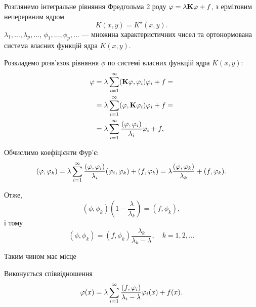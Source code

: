 Розглянемо інтегральне рівняння Фредгольма 2 роду $\phi = \lambda \bf{K} \phi + f$, з ермітовим неперервним ядром 
\begin{equation} 
    K(x, y) = K^\star  (x, y).
\end{equation}
$\lambda_1, \ldots, \lambda_p, \ldots$, $\phi_1, \ldots, \phi_p, \ldots$ --- множина характеристичних чисел та ортонормована система власних функцій ядра $K(x, y)$. \medskip

Розкладемо розв'язок рівняння $\phi$ по системі власних функцій ядра $K(x, y)$:
\begin{equation}
    \begin{aligned}
        \phi &= \lambda \Sum_{i = 1}^\infty (\bf{K}\phi, \phi_i) \phi_i + f = \\
        &= \lambda \Sum_{i = 1}^\infty (\phi, \bf{K} \phi_i) \phi_i + f = \\
        &= \lambda \Sum_{i = 1}^\infty \dfrac{(\phi, \phi_i)}{\lambda_i} \phi_i + f,
    \end{aligned}
\end{equation}

Обчислимо коефіцієнти Фур'є:
\begin{equation}
    (\phi, \phi_k) = \lambda \Sum_{i = 1}^\infty \dfrac{(\phi, \phi_i)}{\lambda_i} (\phi_i, \phi_k) + (f, \phi_k) = \lambda \dfrac{(\phi, \phi_k)}{\lambda_k} + (f, \phi_k).
\end{equation}

Отже,
\begin{equation}
    (\phi, \phi_k) \left(1 - \frac{\lambda}{\lambda_k}\right) = (f, \phi_k),
\end{equation}
і тому
\begin{equation}
    (\phi, \phi_k) = (f, \phi_k) \frac{\lambda_k}{\lambda_k - \lambda}, \quad k = 1, 2, \ldots
\end{equation}

Таким чином має місце 
\begin{theorem}
    Виконується співвідношення
    \begin{equation}
        \phi(x) = \lambda \Sum_{i = 1}^\infty \dfrac{(f, \phi_i)}{\lambda_i - \lambda} \phi_i(x) + f(x).
    \end{equation}
\end{theorem}

